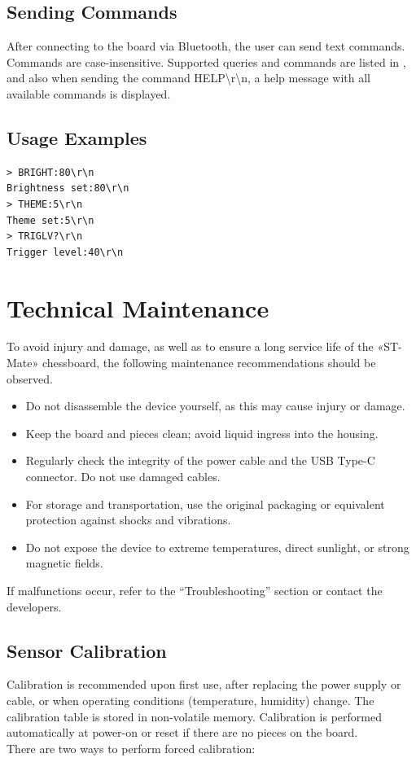 \documentclass[a4paper,12pt]{article}
\begin{document}
\subsection{Sending Commands}
After connecting to the board via Bluetooth, the user can send text commands.
Commands are case-insensitive.
Supported queries and commands are listed in , and also when sending the command HELP\textbackslash{r}\textbackslash{n}, a help message with all available commands is displayed.

\subsection{Usage Examples}
\begin{verbatim}
> BRIGHT:80\r\n 
Brightness set:80\r\n
> THEME:5\r\n
Theme set:5\r\n
> TRIGLV?\r\n
Trigger level:40\r\n
\end{verbatim}

\section{Technical Maintenance}
\label{sec:maintenance}

To avoid injury and damage, as well as to ensure a long service life of the «ST-Mate» chessboard, the following maintenance recommendations should be observed.
\begin{itemize}
    \item Do not disassemble the device yourself, as this may cause injury or damage.
    \item Keep the board and pieces clean; avoid liquid ingress into the housing.
    \item Regularly check the integrity of the power cable and the USB Type-C connector. Do not use damaged cables.
    \item For storage and transportation, use the original packaging or equivalent protection against shocks and vibrations.
    \item Do not expose the device to extreme temperatures, direct sunlight, or strong magnetic fields.
\end{itemize}
If malfunctions occur, refer to the “Troubleshooting” section or contact the developers.

\subsection{Sensor Calibration}
Calibration is recommended upon first use, after replacing the power supply or cable, or when operating conditions (temperature, humidity) change.
The calibration table is stored in non-volatile memory.
Calibration is performed automatically at power-on or reset if there are no pieces on the board.\\
There are two ways to perform forced calibration:
\end{document}
